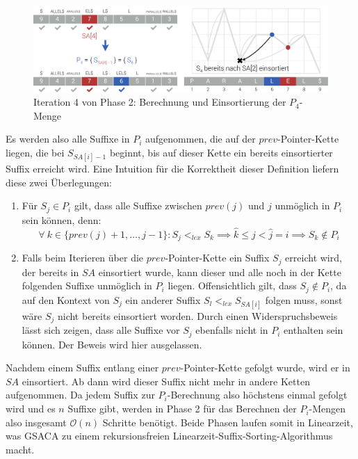 \documentclass[twoside,a4paper,11pt]{article}
\theoremstyle{break}
\begin{document}
\hline
\begin{figure}[H]
	\centering
	\includegraphics[width=\linewidth,bb=0 0 1310 386]{./assets/phase2-4.pdf}
	\caption{Iteration 4 von Phase 2: Berechnung und Einsortierung der $P_4$-Menge}
\label{fig:phase2-4}
\end{figure}

Es werden also alle Suffixe in $P_i$ aufgenommen, die auf der $prev$-Pointer-Kette liegen, die bei $S_{SA[i] - 1}$ beginnt, bis auf dieser Kette ein bereits einsortierter Suffix erreicht wird. Eine Intuition für die Korrektheit dieser Definition liefern diese zwei Überlegungen:

\begin{enumerate}
	\item Für $S_j \in P_i$ gilt, dass alle Suffixe zwischen $prev(j)$ und $j$ unmöglich in $P_i$ sein können, denn: $$\forall\ k \in \{ prev(j) + 1, \dots, j - 1 \}: S_j <_{lex} S_k \implies \widehat{k} \le j < \widehat{j} = i \implies S_k \notin P_i$$
	\item Falls beim Iterieren über die $prev$-Pointer-Kette ein Suffix $S_j$ erreicht wird, der bereits in $SA$ einsortiert wurde, kann dieser und alle noch in der Kette folgenden Suffixe unmöglich in $P_i$ liegen. Offensichtlich gilt, dass $S_j \notin P_i$, da auf den Kontext von $S_j$ ein anderer Suffix $S_l <_{lex} S_{SA[i]}$ folgen muss, sonst wäre $S_j$ nicht bereits einsortiert worden. Durch einen Widerspruchsbeweis lässt sich zeigen, dass alle Suffixe vor $S_j$ ebenfalls nicht in $P_i$ enthalten sein können. Der Beweis wird hier ausgelassen.
\end{enumerate}

Nachdem einem Suffix entlang einer $prev$-Pointer-Kette gefolgt wurde, wird er in $SA$ einsortiert. Ab dann wird dieser Suffix nicht mehr in andere Ketten aufgenommen. Da jedem Suffix zur $P_i$-Berechnung also höchstens einmal gefolgt wird und es $n$ Suffixe gibt, werden in Phase 2 für das Berechnen der $P_i$-Mengen also insgesamt $\mathcal{O}(n)$ Schritte benötigt. Beide Phasen laufen somit in Linearzeit, was GSACA zu einem rekursionsfreien Linearzeit-Suffix-Sorting-Algorithmus macht.
\end{document}
